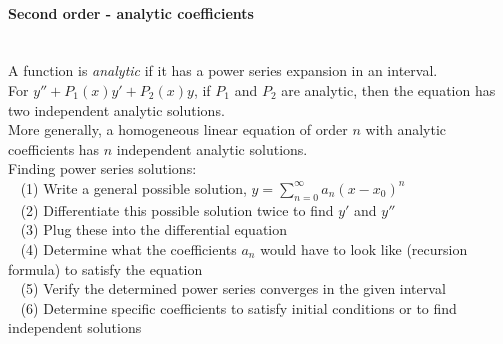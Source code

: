 \documentclass[10pt]{article}
\begin{document}
\paragraph{Second order - analytic coefficients}\ \\
A function is {\it analytic} if it has a power series expansion in an interval.\\
For $y'' + P_1(x)y' + P_2(x)y$, if $P_1$ and $P_2$ are analytic, then the equation has two independent analytic solutions.\\
More generally, a homogeneous linear equation of order $n$ with analytic coefficients has $n$ independent analytic solutions.\\
Finding power series solutions:\\
$\phantom{x}$ (1) Write a general possible solution, $y = \sum_{n=0}^\infty a_n (x-x_0)^n$\\
$\phantom{x}$ (2) Differentiate this possible solution twice to find $y'$ and $y''$\\
$\phantom{x}$ (3) Plug these into the differential equation\\
$\phantom{x}$ (4) Determine what the coefficients $a_n$ would have to look like (recursion formula) to satisfy the equation\\
$\phantom{x}$ (5) Verify the determined power series converges in the given interval\\
$\phantom{x}$ (6) Determine specific coefficients to satisfy initial conditions or to find independent solutions
\end{document}
